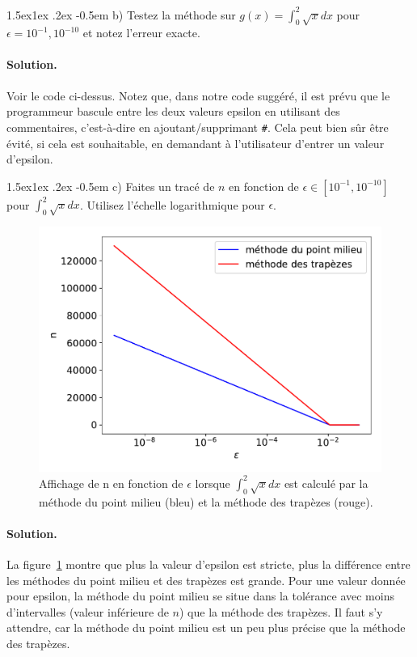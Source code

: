 \documentclass[%
oneside,                 %
final,                   %
10pt,french]{article}
\makeatletter
\newenvironment{doconceexercise}{}{}
\newcommand\subex{\@startsection{paragraph}{4}{\z@}%
                  {1.5ex\@plus1ex \@minus.2ex}%
                  {-0.5em}%
                  {\normalfont\normalsize\bfseries}}
\makeatother
\begin{document}
\begin{doconceexercise}

\subex{b)}
Testez la méthode sur $g(x) = \int_0^2\sqrt{x}dx$ pour $\epsilon = 10^{−1},10^{−10}$ et notez l'erreur exacte.


\paragraph{Solution.}
Voir le code ci-dessus. Notez que, dans notre code suggéré, il est prévu que le programmeur bascule entre les deux valeurs epsilon en utilisant des commentaires, c'est-à-dire en ajoutant/supprimant \Verb!#!. Cela peut bien sûr être évité, si cela est souhaitable, en demandant à l'utilisateur d'entrer un valeur d'epsilon.


\subex{c)}
Faites un tracé de $n$ en fonction de $\epsilon \in [10^{-1}, 10^{-10}]$ pour $\int_0^2\sqrt{x}dx$. Utilisez l'échelle logarithmique pour $\epsilon$.


\begin{figure}[!ht]  %
  \centerline{\includegraphics[width=0.7\linewidth]{imgs/eps.pdf}}
  \caption{
  Affichage de n en fonction de $\epsilon$ lorsque $\int_0^2\sqrt{x}dx$ est calculé par la méthode du point milieu (bleu) et la méthode des trapèzes (rouge). \label{fig:eps}
  }
\end{figure}



\paragraph{Solution.}
La figure~\ref{fig:eps} montre que plus la valeur d'epsilon est stricte, plus la différence entre les méthodes du point milieu et des trapèzes est grande. Pour une valeur donnée pour epsilon, la méthode du point milieu se situe dans la tolérance avec moins d'intervalles (valeur inférieure de $n$) que la méthode des trapèzes. Il faut s'y attendre, car la méthode du point milieu est un peu plus précise que la méthode des trapèzes.


\end{doconceexercise}
\end{document}
